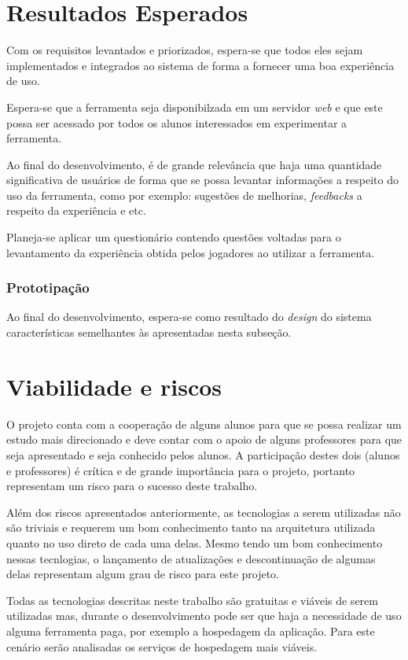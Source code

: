 \chapter{Resultados Esperados}
Com os requisitos levantados e priorizados, espera-se que todos eles sejam implementados e integrados ao sistema de forma a fornecer uma boa experiência
de uso. 

Espera-se que a ferramenta seja disponibilzada em um servidor \textit{web} e que este possa ser acessado por todos os alunos interessados em experimentar
a ferramenta.

Ao final do desenvolvimento, é de grande relevância que haja uma quantidade significativa de usuários de forma que se possa levantar informações a respeito
do uso da ferramenta, como por exemplo: sugestões de melhorias, \textit{feedbacks} a respeito da experiência e etc.

Planeja-se aplicar um questionário contendo questões voltadas para o levantamento da experiência obtida pelos jogadores ao utilizar a ferramenta.

\subsection{Prototipação}
Ao final do desenvolvimento, espera-se como resultado do \textit{design} do sistema características semelhantes às apresentadas nesta subseção. 

\chapter{Viabilidade e riscos}
O projeto conta com a cooperação de alguns alunos para que se possa realizar um estudo mais direcionado e deve contar com o apoio de alguns professores
para que seja apresentado e seja conhecido pelos alunos. A participação destes dois (alunos e professores) é crítica  e de grande importância para o projeto,
portanto representam um risco para o sucesso deste trabalho.

Além dos riscos apresentados anteriormente, as tecnologias a serem utilizadas não são triviais e requerem um bom conhecimento tanto na arquitetura utilizada
quanto no uso direto de cada uma delas. Mesmo tendo um bom conhecimento nessas tecnlogias, o lançamento de atualizações e descontinuação de algumas delas representam
algum grau de risco para este projeto.

Todas as tecnologias descritas neste trabalho são gratuitas e viáveis de serem utilizadas mas, durante o desenvolvimento pode ser que haja a 
necessidade de uso alguma ferramenta paga, por exemplo a hospedagem da aplicação. Para este cenário serão analisadas os serviços de hospedagem mais
viáveis.

